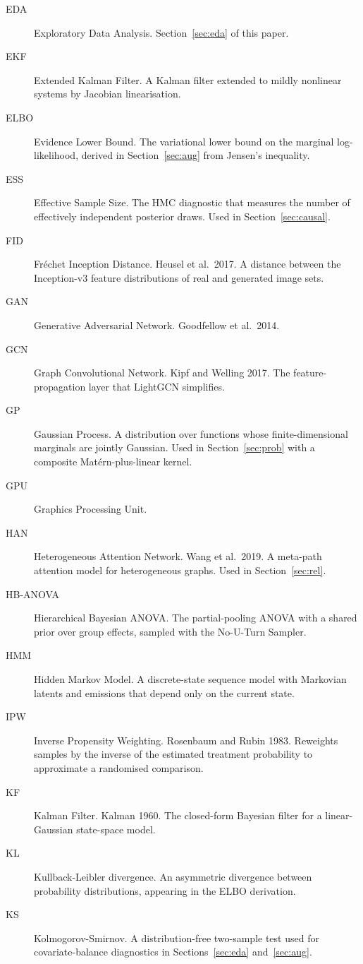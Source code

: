 \documentclass{article}
\begin{document}
\begin{description}
\item[EDA] Exploratory Data Analysis. Section~\ref{sec:eda} of this paper.
\item[EKF] Extended Kalman Filter. A Kalman filter extended to mildly nonlinear systems by Jacobian linearisation.
\item[ELBO] Evidence Lower Bound. The variational lower bound on the marginal log-likelihood, derived in Section~\ref{sec:aug} from Jensen's inequality.
\item[ESS] Effective Sample Size. The HMC diagnostic that measures the number of effectively independent posterior draws. Used in Section~\ref{sec:causal}.
\item[FID] Fr\'echet Inception Distance. Heusel et al.\ 2017. A distance between the Inception-v3 feature distributions of real and generated image sets.
\item[GAN] Generative Adversarial Network. Goodfellow et al.\ 2014.
\item[GCN] Graph Convolutional Network. Kipf and Welling 2017. The feature-propagation layer that LightGCN simplifies.
\item[GP] Gaussian Process. A distribution over functions whose finite-dimensional marginals are jointly Gaussian. Used in Section~\ref{sec:prob} with a composite Mat\'ern-plus-linear kernel.
\item[GPU] Graphics Processing Unit.
\item[HAN] Heterogeneous Attention Network. Wang et al.\ 2019. A meta-path attention model for heterogeneous graphs. Used in Section~\ref{sec:rel}.
\item[HB-ANOVA] Hierarchical Bayesian ANOVA. The partial-pooling ANOVA with a shared prior over group effects, sampled with the No-U-Turn Sampler.
\item[HMM] Hidden Markov Model. A discrete-state sequence model with Markovian latents and emissions that depend only on the current state.
\item[IPW] Inverse Propensity Weighting. Rosenbaum and Rubin 1983. Reweights samples by the inverse of the estimated treatment probability to approximate a randomised comparison.
\item[KF] Kalman Filter. Kalman 1960. The closed-form Bayesian filter for a linear-Gaussian state-space model.
\item[KL] Kullback-Leibler divergence. An asymmetric divergence between probability distributions, appearing in the ELBO derivation.
\item[KS] Kolmogorov-Smirnov. A distribution-free two-sample test used for covariate-balance diagnostics in Sections~\ref{sec:eda} and~\ref{sec:aug}.

\end{description}
\end{document}
